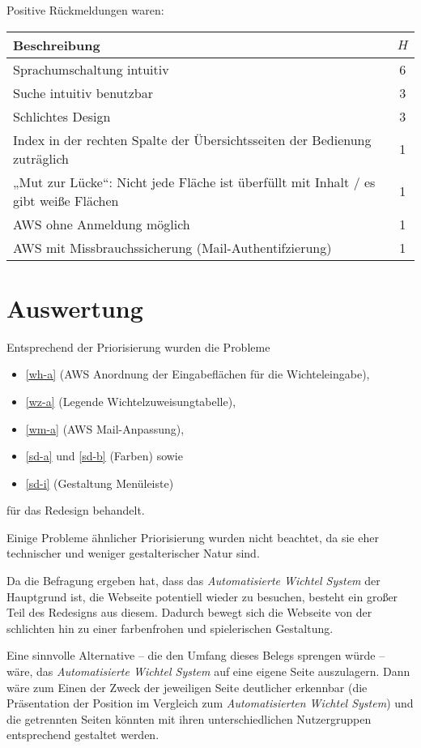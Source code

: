Positive Rückmeldungen waren:
\begin{center}
\begin{tabular}{L{.92} | C{.08}}
Beschreibung& $H$ \\\hline
Sprachumschaltung intuitiv & 6\\
Suche intuitiv benutzbar & 3\\
Schlichtes Design & 3\\
Index in der rechten Spalte der Übersichtsseiten der Bedienung zuträglich & 1\\
„Mut zur Lücke“: Nicht jede Fläche ist überfüllt mit Inhalt / es gibt weiße Flächen & 1\\
AWS ohne Anmeldung möglich & 1\\
AWS mit Missbrauchssicherung (Mail-Authentifzierung) & 1\\
\end{tabular}
\end{center}

\section{Auswertung}
Entsprechend der Priorisierung wurden die Probleme 
\begin{itemize}
\item \ref{wh-a} (AWS Anordnung der Eingabeflächen für die Wichteleingabe), 
\item \ref{wz-a} (Legende Wichtelzuweisungtabelle), 
\item \ref{wm-a} (AWS Mail-Anpassung), 
\item \ref{sd-a} und \ref{sd-b} (Farben) sowie 
\item \ref{sd-i} (Gestaltung Menüleiste) 
\end{itemize}
für das Redesign behandelt. 

Einige Probleme ähnlicher Priorisierung wurden nicht beachtet, da sie eher technischer und weniger gestalterischer Natur sind.\bigskip

Da die Befragung ergeben hat, dass das \emph{Automatisierte Wichtel System} der Hauptgrund ist, die Webseite potentiell wieder zu besuchen, besteht ein großer Teil des Redesigns aus diesem. Dadurch bewegt sich die Webseite von der schlichten hin zu einer farbenfrohen und spielerischen Gestaltung. 

Eine sinnvolle Alternative -- die den Umfang dieses Belegs sprengen würde -- wäre, das \emph{Automatisierte Wichtel System} auf eine eigene Seite auszulagern. Dann wäre zum Einen der Zweck der jeweiligen Seite deutlicher erkennbar (die Präsentation der Position im Vergleich zum \emph{Automatisierten Wichtel System}) und die getrennten Seiten könnten mit ihren unterschiedlichen Nutzergruppen entsprechend gestaltet werden.\bigskip

